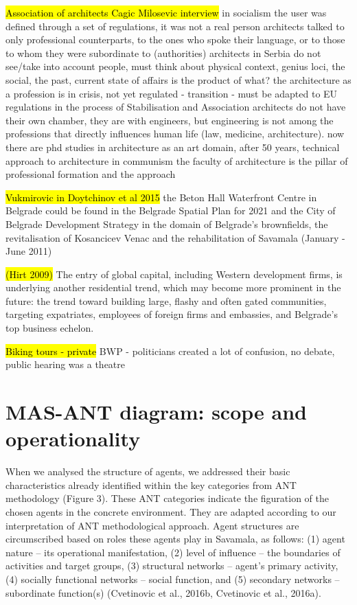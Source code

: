 \documentclass[11pt]{report}
\begin{document}
\hl{Association of architects Cagic Milosevic interview}
in socialism the user was defined through a set of regulations, it was not a real person
architects talked to only professional counterparts, to the ones who spoke their language, or to those to whom they were subordinate to (authorities)
architects in Serbia do not see/take into account people, must think about physical context, genius loci, the social, the past, current state of affairs is the product of what?
the architecture as a profession is in crisis, not yet regulated - transition - must be adapted to EU regulations in the process of Stabilisation and Association
architects do not have their own chamber, they are with engineers, but engineering is not among the professions that directly influences human life (law, medicine, architecture).
now there are phd studies in architecture as an art domain, after 50 years, technical approach to architecture in communism
the faculty of architecture is the pillar of professional formation and the approach

\hl{Vukmirovic in Doytchinov et al 2015}
the Beton Hall Waterfront Centre in Belgrade could be found in the Belgrade Spatial Plan for 2021 and the City of Belgrade Development Strategy in the domain of Belgrade’s brownfields, the revitalisation of Kosancicev Venac and the rehabilitation of Savamala  (January - June 2011)

\hl{(Hirt 2009)}
The entry of global capital, including Western development ﬁrms, is underlying another residential trend, which may become more prominent in the future: the trend toward building large, ﬂashy and often gated communities, targeting expatriates, employees of foreign firms and embassies, and Belgrade’s top business echelon.

\hl{Biking tours - private}
BWP - politicians created a lot of confusion, no debate, public hearing was a theatre

\section{MAS-ANT diagram: scope and operationality}

When we analysed the structure of agents, we addressed their basic characteristics already identified within the key categories from ANT methodology (Figure 3). These ANT categories indicate the figuration of the chosen agents in the concrete environment. They are adapted according to our interpretation of ANT methodological approach. Agent structures are circumscribed based on roles these agents play in Savamala, as follows: (1) agent nature – its operational manifestation, (2) level of influence – the boundaries of activities and target groups, (3) structural networks – agent’s primary activity, (4) socially functional networks – social function, and (5) secondary networks – subordinate function(s) (Cvetinovic et al., 2016b, Cvetinovic et al., 2016a).
\end{document}
